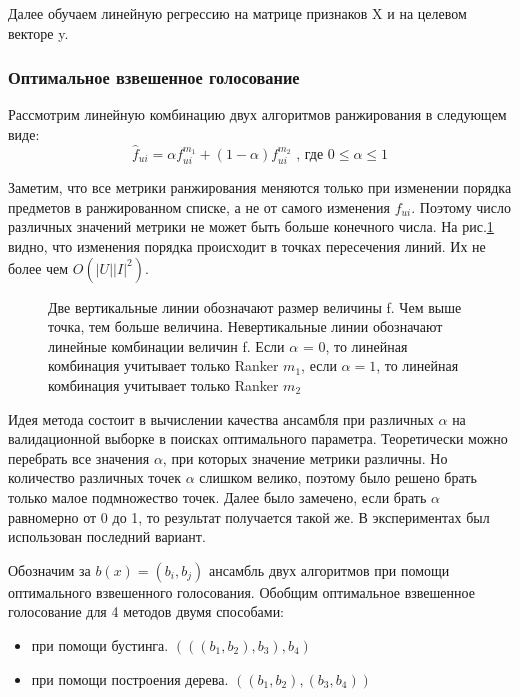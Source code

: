 \documentclass[a4paper,12pt]{article}
\begin{document}
Далее обучаем  линейную регрессию на матрице признаков X и на целевом векторе y. 

\subsubsection*{Оптимальное взвешенное голосование} 
      Рассмотрим линейную комбинацию двух алгоритмов ранжирования  в следующем виде:
\begin{equation*}
	\hat{f}_{ui} = \alpha f_{ui}^{m_1} + (1 - \alpha) f_{ui} ^ {m_2} \textrm{\ , где $0 \leq \alpha \leq 1$} 
\end{equation*}


	Заметим, что все метрики ранжирования меняются только при изменении порядка предметов в ранжированном списке, а не от самого изменения $f_{ui}$. Поэтому число различных значений метрики не может быть больше конечного числа. На рис.\ref{pic:latexpic} видно, что изменения порядка происходит в точках пересечения линий. Их  не более чем $O(|U||I|^2)$. 

\begin{figure}[h]
\caption{Две вертикальные линии обозначают размер величины f. Чем выше точка, тем больше величина. Невертикальные линии обозначают линейные комбинации величин f. Если $\alpha$ = 0, то линейная комбинация учитывает только Ranker $m_1$, если $\alpha = 1$, то  линейная комбинация учитывает только Ranker $m_2$}
\label{pic:latexpic}
\end{figure}
	
	Идея метода состоит в вычислении качества ансамбля при различных $\alpha$ на валидационной выборке в поисках оптимального параметра. Теоретически  можно перебрать все значения $\alpha$, при которых значение метрики различны. Но количество различных точек $\alpha$ слишком велико, поэтому было решено брать только малое подмножество точек. Далее было замечено, если брать $\alpha$ равномерно от 0 до 1, то результат получается такой же. В экспериментах был использован последний вариант.
	
	Обозначим за $b(x) = (b_i, b_j)$ ансамбль двух алгоритмов при помощи оптимального взвешенного голосования. 
	Обобщим оптимальное взвешенное голосование для 4 методов двумя способами:
	\begin{itemize}
	\item при помощи бустинга. $(((b_1, b_2), b_3), b_4)$
	\item при помощи построения дерева. $((b_1,b_2), (b_3, b_4))$
	\end{itemize}
	
\end{document}
